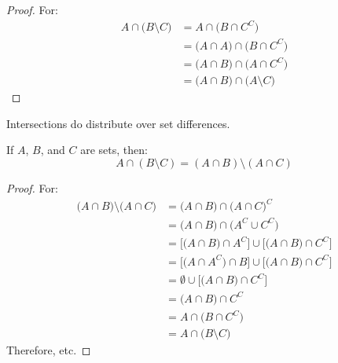         \begin{proof}
            For:
            \begin{subequations}
                \begin{align}
                    A\cap\big(B\setminus{C}\big)
                    &=A\cap\big(B\cap{C}^{C}\big)\\
                    &=\big(A\cap{A}\big)
                        \cap\big(B\cap{C}^{C}\big)\\
                    &=\big(A\cap{B}\big)
                        \cap\big(A\cap{C}^{C}\big)\\
                    &=\big(A\cap{B}\big)
                        \cap\big(A\setminus{C}\big)
                \end{align}
            \end{subequations}
        \end{proof}
        Intersections do distribute over set differences.
        \begin{theorem}
            If $A$, $B$, and $C$ are sets, then:
            \begin{equation}
                A\cap(B\setminus{C})=
                (A\cap{B})\setminus(A\cap{C})
            \end{equation}
        \end{theorem}
        \begin{proof}
            For:
            \begin{subequations}
                \begin{align}
                    \big(A\cap{B}\big)\setminus
                        \big(A\cap{C}\big)
                    &=\big(A\cap{B}\big)
                        \cap\big(A\cap{C}\big)^{C}\\
                    &=\big(A\cap{B}\big)
                        \cap\big(A^{C}\cup{C}^{C}\big)\\
                    &=\big[\big(A\cap{B}\big)\cap{A}^{C}\big]
                        \cup\big[\big({A}\cap{B}\big)
                        \cap{C}^{C}\big]\\
                    &=\big[\big(A\cap{A}^{C}\big)\cap{B}\big]
                        \cup\big[\big(A\cap{B}\big)
                        \cap{C}^{C}\big]\\
                    &=\emptyset\cup\big[\big(A\cap{B}\big)
                        \cap{C}^{C}\big]\\
                    &=\big(A\cap{B}\big)\cap{C}^{C}\\
                    &=A\cap\big(B\cap{C}^{C}\big)\\
                    &=A\cap\big(B\setminus{C}\big)
                \end{align}
            \end{subequations}
            Therefore, etc.
        \end{proof}
